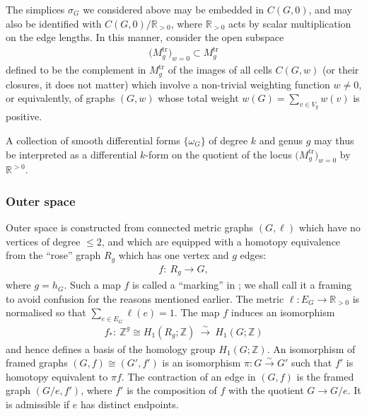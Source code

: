 \documentclass[pdftex]{sigma}%
\numberwithin{equation}{section}
\newcommand{\To}{\longrightarrow}
\newcommand{\Z}{\mathbb Z}
\newcommand{\R}{\mathbb R}
\newcommand{\tr}{\mathrm{tr}}
\newcommand{\0}{\color{blue}{\mathsf{0}}}
\begin{document}
 The simplices $\sigma_G $ we considered above may be embedded in $C(G,0)$, and may also be identified with $C(G,0)/\R_{>0}$, where $\R_{>0}$ acts by scalar multiplication on the edge lengths. In this manner, consider the open subspace
 \begin{gather*}
 \big(M^{\tr}_g\big)_{w=0} \subset M^{\tr}_g
 \end{gather*}
 defined to be the complement in $M^{\tr}_g$ of the images of all cells $C(G,w)$ (or their closures, it does not matter) which involve a non-trivial weighting function $w\neq 0$, or equivalently, of graphs $(G,w)$ whose total weight $w(G) = \sum_{v\in V_g} w(v) $ is positive.

 A collection of smooth differential forms $\{\omega_G\}$ of degree $k$ and genus $g$
 may thus be interpreted as a differential $k$-form on the quotient of the locus $\big(M^{\tr}_g\big)_{w=0}$ by $\R^{>0}$.

 \subsubsection{Outer space}
 Outer space is constructed from connected metric graphs $(G,\ell)$ which have no vertices of degree $\leq 2$, and which are equipped with a homotopy equivalence from the ``rose'' graph $R_g$ which has one vertex and $g$ edges:
 \begin{gather*}
 f\colon\ R_g \To G,
 \end{gather*}
 where $g= h_G$. Such a map $f$ is called a ``marking'' in \cite{CullerVogtmann}; we shall call it a framing to avoid confusion for the reasons mentioned earlier. The metric $\ell\colon E_G \rightarrow \R_{>0}$ is normalised so that $\sum_{e \in E_G} \ell(e) =1$.
 The map $f$ induces an isomorphism
 \begin{gather*}
 f_*\colon\ \Z^g \cong H_1(R_g;\Z) \ \overset{\sim}{\To} \ H_1(G;\Z)
 \end{gather*}
 and hence defines a basis of the homology group $H_1(G;\Z)$.
 An isomorphism of framed graphs $(G,f) \cong (G',f')$ is an isomorphism $\pi\colon G \overset{\sim}{\rightarrow} G'$ such that $f'$ is homotopy equivalent to $\pi f$. The contraction of an edge in $(G,f)$ is the framed graph $(G/e, f')$, where $f'$ is the composition of $f$ with the quotient $G \rightarrow G/e$. It is admissible if $e$ has distinct endpoints.
\end{document}
